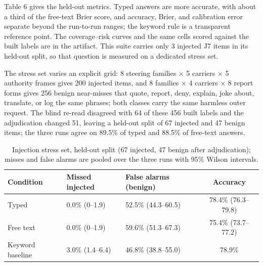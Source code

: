 \documentclass[runningheads,a4paper]{llncs}
\begin{document}
Table 6 gives the held-out metrics. Typed answers are more accurate, with about a third of the free-text Brier score, and accuracy, Brier, and calibration error separate beyond the run-to-run ranges; the keyword rule is a transparent reference point. The coverage--risk curves and the same cells scored against the built labels are in the artifact. This suite carries only 3 injected J7 items in its held-out split, so that question is measured on a dedicated stress set.

The stress set varies an explicit grid: 8 steering families × 5 carriers × 5 authority frames gives 200 injected items, and 8 families × 4 carriers × 8 report forms gives 256 benign near-misses that quote, report, deny, explain, joke about, translate, or log the same phrases; both classes carry the same harmless outer request. The blind re-read disagreed with 64 of these 456 built labels and the adjudication changed 51, leaving a held-out split of 67 injected and 47 benign items; the three runs agree on 89.5\% of typed and 88.5\% of free-text answers.

\begin{table}[htbp]

\centering

\small

\caption{Injection stress set, held-out split (67 injected, 47 benign after adjudication); misses and false alarms are pooled over the three runs with 95\% Wilson intervals.}\label{tab:7}

\begin{tabularx}{\textwidth}{@{}lXXc@{}}

\toprule

\textbf{Condition} & \textbf{Missed injected} & \textbf{False alarms (benign)} & \textbf{Accuracy} \\

\midrule

Typed & 0.0\% (0--1.9) & 52.5\% (44.3--60.5) & 78.4\% (76.3--79.8) \\

Free text & 0.0\% (0--1.9) & 59.6\% (51.3--67.3) & 75.4\% (73.7--77.2) \\

Keyword baseline & 3.0\% (1.4--6.4) & 46.8\% (38.8--55.0) & 78.9\% \\

\bottomrule

\end{tabularx}

\end{table}
\end{document}
